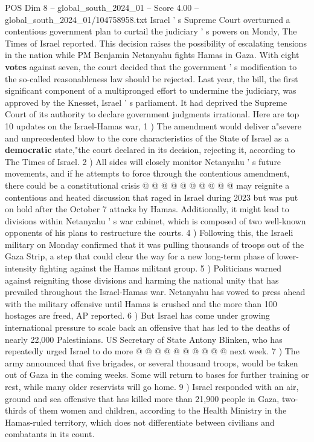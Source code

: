 \begin{textsample}{POS Dim 8 – global\_south\_2024\_01 – Score 4.00 – global\_south\_2024\_01/104758958.txt}  \label{ex:f8_pos_287}
Israel ' s Supreme Court overturned a contentious government plan to curtail the judiciary ' s powers on Mondy, The Times of Israel reported.
This decision raises the possibility of escalating tensions in the nation while PM Benjamin Netanyahu fights Hamas in Gaza.
With eight \textbf{votes} against seven, the court decided that the government ' s modification to the so-called reasonableness law should be rejected.
Last year, the bill, the first significant component of a multipronged effort to undermine the judiciary, was approved by the Knesset, Israel ' s parliament.
It had deprived the Supreme Court of its authority to declare government judgments irrational.
Here are top 10 updates on the Israel-Hamas war, 1 ) The amendment would deliver a"severe and unprecedented blow to the core characteristics of the State of Israel as a \textbf{democratic} state,"the court declared in its decision, rejecting it, according to The Times of Israel. 2 ) All sides will closely monitor Netanyahu ' s future movements, and if he attempts to force through the contentious amendment, there could be a constitutional crisis @ @ @ @ @ @ @ @ @ @ may reignite a contentious and heated discussion that raged in Israel during 2023 but was put on hold after the October 7 attacks by Hamas.
Additionally, it might lead to divisions within Netanyahu ' s war cabinet, which is composed of two well-known opponents of his plans to restructure the courts. 4 ) Following this, the Israeli military on Monday confirmed that it was pulling thousands of troops out of the Gaza Strip, a step that could clear the way for a new long-term phase of lower-intensity fighting against the Hamas militant group. 5 ) Politicians warned against reigniting those divisions and harming the national unity that has prevailed throughout the Israel-Hamas war.
Netanyahu has vowed to press ahead with the military offensive until Hamas is crushed and the more than 100 hostages are freed, AP reported. 6 ) But Israel has come under growing international pressure to scale back an offensive that has led to the deaths of nearly 22,000 Palestinians.
US Secretary of State Antony Blinken, who has repeatedly urged Israel to do more @ @ @ @ @ @ @ @ @ @ next week. 7 ) The army announced that five brigades, or several thousand troops, would be taken out of Gaza in the coming weeks.
Some will return to bases for further training or rest, while many older reservists will go home. 9 ) Israel responded with an air, ground and sea offensive that has killed more than 21,900 people in Gaza, two-thirds of them women and children, according to the Health Ministry in the Hamas-ruled territory, which does not differentiate between civilians and combatants in its count.

\end{textsample}

